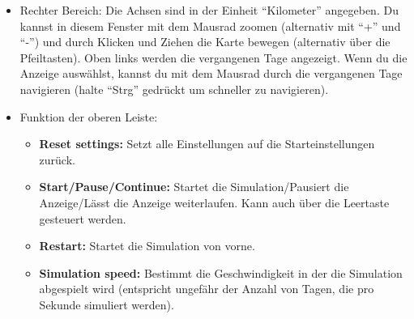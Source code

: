\documentclass{scrartcl}
\begin{document}
\begin{itemize}[leftmargin=*]
\begin{itemize}
\begin{itemize}
                    (Mit "`Strg+g"' kannst du die Gitterlinien im Plot entfernen oder wieder hinzufügen.)
                    \end{itemize}
                    \item \textbf{Objects:} Hier kannst du einstellen, mit welchen Himmelskörpern gerechnet werden soll. Du kannst aus voreingestellten Himmelskörpern wählen oder dir eigene erstellen. 
                    Mit "`+"' fügst du ein Objekt hinzu, mit "`{\sffamily x}"' entfernst du es aus der Berechnung.\\
                    Über das Feld "`Load configuration"' kannst du voreingestellte Sets an Himmelskörpern auswählen. Dabei werden alle aktuell erstellten Objekte entfernt, bevor die neuen hinzugefügt werden.
                \end{itemize}
            \item Rechter Bereich:  
                Die Achsen sind in der Einheit "`Kilometer"' angegeben. 
                Du kannst in diesem Fenster mit dem Mausrad zoomen (alternativ mit "`+"' und "`-"') und durch Klicken und Ziehen die Karte bewegen (alternativ über die Pfeiltasten).
                Oben links werden die vergangenen Tage angezeigt. Wenn du die Anzeige auswählst, kannst du mit dem Mausrad durch die vergangenen Tage navigieren (halte "`Strg"' gedrückt um schneller zu navigieren).
            \item Funktion der oberen Leiste:
                \begin{itemize}
                    \item \textbf{Reset settings:} Setzt alle Einstellungen auf die Starteinstellungen zurück.
                    \item \textbf{Start/Pause/Continue:} Startet die Simulation/Pausiert die Anzeige/Lässt die Anzeige weiterlaufen. Kann auch über die Leertaste gesteuert werden.
                    \item \textbf{Restart:} Startet die Simulation von vorne.
                    \item \textbf{Simulation speed:} Bestimmt die Geschwindigkeit in der die Simulation abgespielt wird (entspricht ungefähr der Anzahl von Tagen, die pro Sekunde simuliert werden).
                \end{itemize}
        \end{itemize}
        

    
\end{document}
